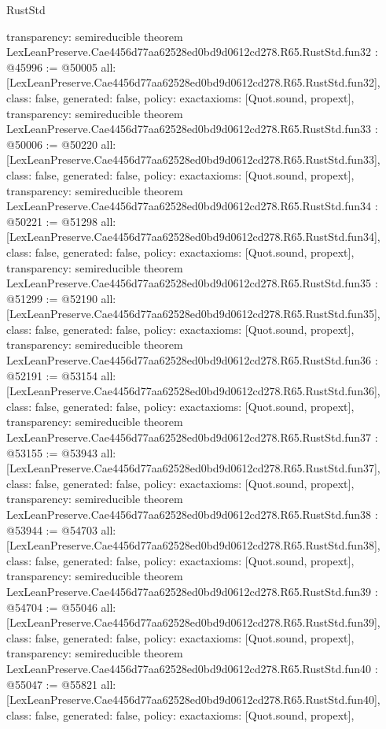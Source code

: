 \begin{lexlean}{RustStd}
\begin{coremodule}
{  transparency: semireducible
}
theorem LexLeanPreserve.Cae4456d77aa62528ed0bd9d0612cd278.R65.RustStd.fun32 : @45996 := @50005 {
  all: [LexLeanPreserve.Cae4456d77aa62528ed0bd9d0612cd278.R65.RustStd.fun32],
  class: false,
  generated: false,
  policy: exact{axioms: [Quot.sound, propext]},
  transparency: semireducible
}
theorem LexLeanPreserve.Cae4456d77aa62528ed0bd9d0612cd278.R65.RustStd.fun33 : @50006 := @50220 {
  all: [LexLeanPreserve.Cae4456d77aa62528ed0bd9d0612cd278.R65.RustStd.fun33],
  class: false,
  generated: false,
  policy: exact{axioms: [Quot.sound, propext]},
  transparency: semireducible
}
theorem LexLeanPreserve.Cae4456d77aa62528ed0bd9d0612cd278.R65.RustStd.fun34 : @50221 := @51298 {
  all: [LexLeanPreserve.Cae4456d77aa62528ed0bd9d0612cd278.R65.RustStd.fun34],
  class: false,
  generated: false,
  policy: exact{axioms: [Quot.sound, propext]},
  transparency: semireducible
}
theorem LexLeanPreserve.Cae4456d77aa62528ed0bd9d0612cd278.R65.RustStd.fun35 : @51299 := @52190 {
  all: [LexLeanPreserve.Cae4456d77aa62528ed0bd9d0612cd278.R65.RustStd.fun35],
  class: false,
  generated: false,
  policy: exact{axioms: [Quot.sound, propext]},
  transparency: semireducible
}
theorem LexLeanPreserve.Cae4456d77aa62528ed0bd9d0612cd278.R65.RustStd.fun36 : @52191 := @53154 {
  all: [LexLeanPreserve.Cae4456d77aa62528ed0bd9d0612cd278.R65.RustStd.fun36],
  class: false,
  generated: false,
  policy: exact{axioms: [Quot.sound, propext]},
  transparency: semireducible
}
theorem LexLeanPreserve.Cae4456d77aa62528ed0bd9d0612cd278.R65.RustStd.fun37 : @53155 := @53943 {
  all: [LexLeanPreserve.Cae4456d77aa62528ed0bd9d0612cd278.R65.RustStd.fun37],
  class: false,
  generated: false,
  policy: exact{axioms: [Quot.sound, propext]},
  transparency: semireducible
}
theorem LexLeanPreserve.Cae4456d77aa62528ed0bd9d0612cd278.R65.RustStd.fun38 : @53944 := @54703 {
  all: [LexLeanPreserve.Cae4456d77aa62528ed0bd9d0612cd278.R65.RustStd.fun38],
  class: false,
  generated: false,
  policy: exact{axioms: [Quot.sound, propext]},
  transparency: semireducible
}
theorem LexLeanPreserve.Cae4456d77aa62528ed0bd9d0612cd278.R65.RustStd.fun39 : @54704 := @55046 {
  all: [LexLeanPreserve.Cae4456d77aa62528ed0bd9d0612cd278.R65.RustStd.fun39],
  class: false,
  generated: false,
  policy: exact{axioms: [Quot.sound, propext]},
  transparency: semireducible
}
theorem LexLeanPreserve.Cae4456d77aa62528ed0bd9d0612cd278.R65.RustStd.fun40 : @55047 := @55821 {
  all: [LexLeanPreserve.Cae4456d77aa62528ed0bd9d0612cd278.R65.RustStd.fun40],
  class: false,
  generated: false,
  policy: exact{axioms: [Quot.sound, propext]},
}
\end{coremodule}
\end{lexlean}
